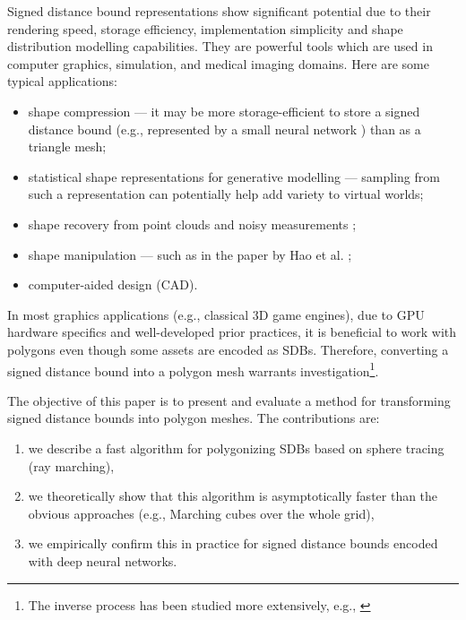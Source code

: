 \documentclass[11pt,twocolumn]{article}
\begin{document}
        Signed distance bound representations show significant potential due to their rendering speed, storage efficiency, implementation simplicity and shape distribution modelling capabilities.
        They are powerful tools which are used in computer graphics, simulation, and medical imaging domains.
  		Here are some typical applications:
		\begin{itemize}
			\item
				shape compression --- it may be more storage-efficient to store a signed distance bound (e.g., represented by a small neural network \cite{davies2020overfit}) than as a triangle mesh;
			\item
				statistical shape representations for generative modelling --- sampling from such a representation \cite{GenShapeCVPR2019,DeepShapeCVPR2019} can potentially help add variety to virtual worlds;
            \item
                shape recovery from point clouds and noisy measurements \cite{ShapeFromPtCould,SecretsOfWildSDFs2021};
			\item
				shape manipulation --- such as in the paper by Hao et al. \cite{hao2020dualsdf};
			\item
				computer-aided design (CAD).
		\end{itemize}
  		
        In most graphics applications (e.g., classical 3D game engines), due to GPU hardware specifics and well-developed prior practices, it is beneficial to work with polygons even though some assets are encoded as SDBs.  
        Therefore, converting a signed distance bound into a polygon mesh warrants investigation\footnote{The inverse process has been studied more extensively, e.g., \cite{DoubleLayerSDF,GenShapeCVPR2019}}.

        The objective of this paper is to present and evaluate a method for transforming signed distance bounds into polygon meshes.
        The contributions are:
        \begin{enumerate}
            \item we describe a fast algorithm for polygonizing SDBs based on sphere tracing (ray marching),
            \item we theoretically show that this algorithm is asymptotically faster than the obvious approaches (e.g., Marching cubes \cite{LorensenCline87marchingcubes} over the whole grid),
            \item we empirically confirm this in practice for signed distance bounds encoded with deep neural networks.
        \end{enumerate}
\end{document}
